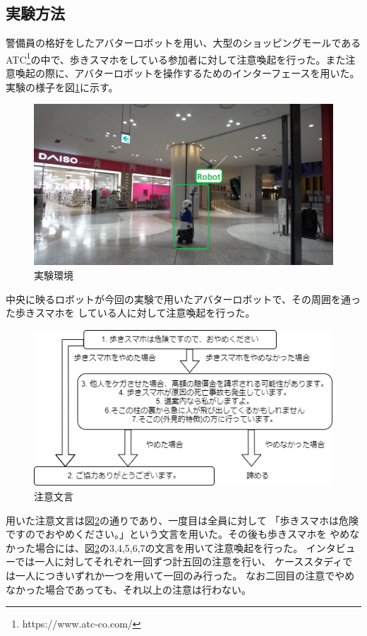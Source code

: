 \documentclass{kuisthesis}
\begin{document}
\subsection{実験方法}
警備員の格好をしたアバターロボットを用い、大型のショッピングモールであるATC\footnote{https://www.atc-co.com/}の中で、歩きスマホをしている参加者に対して注意喚起を行った。また注意喚起の際に、アバターロボットを操作するためのインターフェースを用いた。
実験の様子を図\ref{fig: Experiment}に示す。
\begin{figure}[htbp]
  \includegraphics[width=15cm]{img/Experiment.png}
  \caption{実験環境}
  \label{fig: Experiment}
\end{figure}
中央に映るロボットが今回の実験で用いたアバターロボットで、その周囲を通った歩きスマホを
している人に対して注意喚起を行った。
\begin{figure}[h]
  \includegraphics[width=15cm]{img/waystostop.drawio.png}
  \caption{注意文言}
  \label{fig: Strategy}
\end{figure}
用いた注意文言は図\ref{fig: Strategy}の通りであり、一度目は全員に対して
「歩きスマホは危険ですのでおやめください。」という文言を用いた。その後も歩きスマホを
やめなかった場合には、図\ref{fig: Strategy}の3,4,5,6,7の文言を用いて注意喚起を行った。
インタビューでは一人に対してそれぞれ一回ずつ計五回の注意を行い、
ケーススタディでは一人につきいずれか一つを用いて一回のみ行った。
なお二回目の注意でやめなかった場合であっても、それ以上の注意は行わない。
\end{document}

